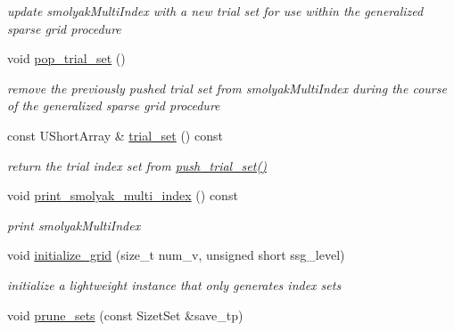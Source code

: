 \begin{DoxyCompactItemize}
\begin{DoxyCompactList}\small\item\em update smolyak\+Multi\+Index with a new trial set for use within the generalized sparse grid procedure \end{DoxyCompactList}\item 
void \hyperlink{classPecos_1_1LightweightSparseGridDriver_a92b2604a79028bec35c176aee27e56bb}{pop\+\_\+trial\+\_\+set} ()\label{classPecos_1_1LightweightSparseGridDriver_a92b2604a79028bec35c176aee27e56bb}

\begin{DoxyCompactList}\small\item\em remove the previously pushed trial set from smolyak\+Multi\+Index during the course of the generalized sparse grid procedure \end{DoxyCompactList}\item 
const U\+Short\+Array \& \hyperlink{classPecos_1_1LightweightSparseGridDriver_a5c92e49dbfbcfa5b0d1523ed254b4d76}{trial\+\_\+set} () const \label{classPecos_1_1LightweightSparseGridDriver_a5c92e49dbfbcfa5b0d1523ed254b4d76}

\begin{DoxyCompactList}\small\item\em return the trial index set from \hyperlink{classPecos_1_1LightweightSparseGridDriver_a99c17efb3a8e873b7708652cc1787370}{push\+\_\+trial\+\_\+set()} \end{DoxyCompactList}\item 
void \hyperlink{classPecos_1_1LightweightSparseGridDriver_ae5bcc14a0e7bb726d5280c3dd10e6c98}{print\+\_\+smolyak\+\_\+multi\+\_\+index} () const \label{classPecos_1_1LightweightSparseGridDriver_ae5bcc14a0e7bb726d5280c3dd10e6c98}

\begin{DoxyCompactList}\small\item\em print smolyak\+Multi\+Index \end{DoxyCompactList}\item 
void \hyperlink{classPecos_1_1LightweightSparseGridDriver_ac6105d921fa39880b9ffddaab414bb3f}{initialize\+\_\+grid} (size\+\_\+t num\+\_\+v, unsigned short ssg\+\_\+level)
\begin{DoxyCompactList}\small\item\em initialize a lightweight instance that only generates index sets \end{DoxyCompactList}\item 
void \hyperlink{classPecos_1_1LightweightSparseGridDriver_a3b5cd6bd45cb1321335605bca233c971}{prune\+\_\+sets} (const Sizet\+Set \&save\+\_\+tp)\label{classPecos_1_1LightweightSparseGridDriver_a3b5cd6bd45cb1321335605bca233c971}


\end{DoxyCompactItemize}
